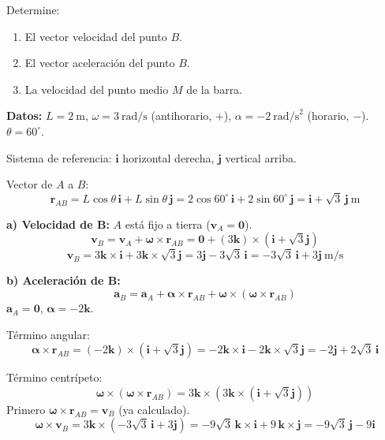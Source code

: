 \documentclass[12pt,a4paper]{article}
\begin{document}
Determine:

\begin{enumerate}[label=\alph*)]
    \item El vector velocidad del punto $B$.
    \item El vector aceleración del punto $B$.
    \item La velocidad del punto medio $M$ de la barra.
\end{enumerate}

\vspace{0.5cm}

\begin{solbox}
\textbf{Datos:} $L = 2\ \text{m}$, $\omega = 3\ \text{rad/s}$ (antihorario, $+$),
$\alpha = -2\ \text{rad/s}^2$ (horario, $-$). $\theta = 60^\circ$.

Sistema de referencia: $\mathbf{i}$ horizontal derecha, $\mathbf{j}$ vertical arriba.

Vector de $A$ a $B$:
\[
\mathbf{r}_{AB} = L\cos\theta\,\mathbf{i} + L\sin\theta\,\mathbf{j}
= 2\cos60^\circ\,\mathbf{i} + 2\sin60^\circ\,\mathbf{j}
= \mathbf{i} + \sqrt{3}\,\mathbf{j} \ \text{m}
\]

\textbf{a) Velocidad de B:}
$A$ está fijo a tierra ($\mathbf{v}_A = \mathbf{0}$).
\[
\mathbf{v}_B = \mathbf{v}_A + \boldsymbol{\omega} \times \mathbf{r}_{AB}
= \mathbf{0} + (3\mathbf{k}) \times (\mathbf{i} + \sqrt{3}\mathbf{j})
\]
\[
\mathbf{v}_B = 3\mathbf{k} \times \mathbf{i} + 3\mathbf{k} \times \sqrt{3}\mathbf{j}
= 3\mathbf{j} - 3\sqrt{3}\,\mathbf{i}
= \boxed{-3\sqrt{3}\,\mathbf{i} + 3\mathbf{j} \ \text{m/s}}
\]

\textbf{b) Aceleración de B:}
\[
\mathbf{a}_B = \mathbf{a}_A + \boldsymbol{\alpha} \times \mathbf{r}_{AB}
             + \boldsymbol{\omega} \times (\boldsymbol{\omega} \times \mathbf{r}_{AB})
\]
$\mathbf{a}_A = \mathbf{0}$, $\boldsymbol{\alpha} = -2\mathbf{k}$.

Término angular:
\[
\boldsymbol{\alpha} \times \mathbf{r}_{AB} = (-2\mathbf{k}) \times (\mathbf{i} + \sqrt{3}\mathbf{j})
= -2\mathbf{k} \times \mathbf{i} -2\mathbf{k} \times \sqrt{3}\mathbf{j}
= -2\mathbf{j} + 2\sqrt{3}\,\mathbf{i}
\]

Término centrípeto:
\[
\boldsymbol{\omega} \times (\boldsymbol{\omega} \times \mathbf{r}_{AB})
= 3\mathbf{k} \times (3\mathbf{k} \times (\mathbf{i} + \sqrt{3}\mathbf{j}))
\]
Primero $\boldsymbol{\omega} \times \mathbf{r}_{AB} = \mathbf{v}_B$ (ya calculado).
\[
\boldsymbol{\omega} \times \mathbf{v}_B = 3\mathbf{k} \times (-3\sqrt{3}\,\mathbf{i} + 3\mathbf{j})
= -9\sqrt{3}\,\mathbf{k}\times\mathbf{i} + 9\,\mathbf{k}\times\mathbf{j}
= -9\sqrt{3}\,\mathbf{j} - 9\mathbf{i}
\]


\end{solbox}
\end{document}
